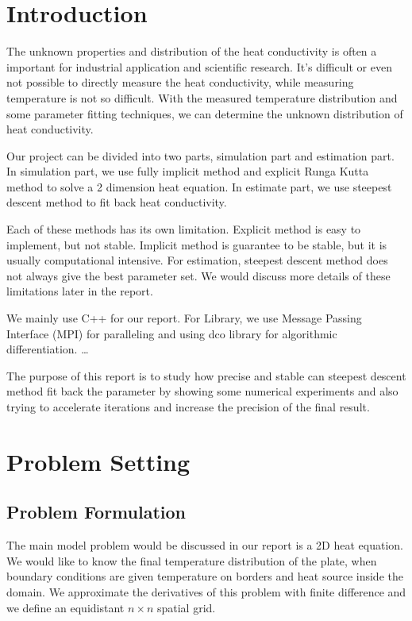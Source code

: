 \documentclass[10pt,a4paper]{report}
\begin{document}
\chapter{Introduction}

The unknown properties and distribution of the heat conductivity is often a important for industrial application and scientific research. It's difficult or even not possible to directly measure the heat conductivity, while measuring temperature is not so difficult. With the measured temperature distribution and some parameter fitting techniques, we can determine the unknown distribution of heat conductivity.

Our project can be divided into two parts, simulation part and estimation part. In simulation part, we use fully implicit method and explicit Runga Kutta method to solve a 2 dimension heat equation. In estimate part, we use steepest descent method to fit back heat conductivity.
 
Each of these methods has its own limitation. Explicit method is easy to implement, but not stable. Implicit method is guarantee to be stable, but it is usually computational intensive. For estimation, steepest descent method does not always give the best parameter set. We would discuss more details of these limitations later in the report. 
 
We mainly use C++ for our report. For Library, we use Message Passing Interface (MPI) for paralleling  and using dco library for algorithmic differentiation. …

The purpose of this report is to study how precise and stable can steepest descent method fit back the parameter by showing some numerical experiments and also trying to accelerate iterations and increase the precision of the final result.  

\chapter{Problem Setting}
\section{Problem Formulation}

The main model problem would be discussed in our report is a 2D heat equation. We would like to know the final temperature distribution of the plate, when boundary conditions are given temperature on borders and heat source inside the domain. We approximate the derivatives of this problem with finite difference and we define an equidistant $n \times  n$ spatial grid. 
\end{document}
